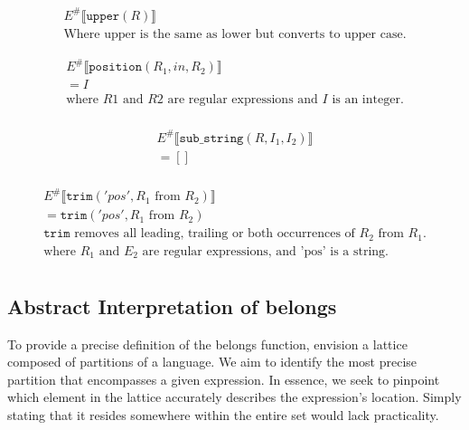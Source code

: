 \begin{align*}
    E^\# \llbracket \texttt{upper}(R) \rrbracket \\
    \text{Where upper is the same as lower but converts to upper case.}
\end{align*}

\begin{align*}
    E^\# \llbracket \texttt{position}(R_1, in, R_2) \rrbracket \\
    = I                                             \\
    \text{where } R1 \text{ and } R2 \text{ are regular expressions and }
    I \text{ is an integer.}                        \\
\end{align*}

\begin{align*}
    E^\# \llbracket \texttt{sub\_string} (R, I_1, I_2) \rrbracket \\
    = []                                                          \\
\end{align*}

\begin{align*}
    E^\# \llbracket \texttt{trim} ('pos', R_1 \text{ from } R_2) \rrbracket                            \\
    =  \texttt{trim}('pos', R_1 \text{ from } R_2)                                                     \\
    \texttt{trim} \text{ removes all leading, trailing or both occurrences of } R_2 \text{ from } R_1. \\
    \text{where } R_1 \text{ and } E_2 \text{ are regular expressions, and 'pos' is a string.}         \\
\end{align*}


\subsection{Abstract Interpretation of belongs}
To provide a precise definition of the belongs function, envision a lattice composed of partitions of a language. We aim to identify the most precise partition that encompasses a given expression. In essence, we seek to pinpoint which element in the lattice accurately describes the expression's location. Simply stating that it resides somewhere within the entire set would lack practicality.

